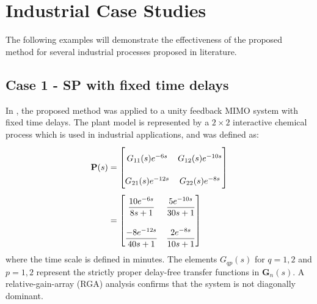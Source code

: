 \documentclass[A4, 10pt, conference]{ieeeconf}
\begin{document}

\section{Industrial Case Studies}
\label{sec:4}
The following examples will demonstrate the effectiveness of the proposed method for several industrial processes proposed in literature.
\subsection{Case 1 - SP with fixed time delays} \label{ex:1}
In \cite{GKL10b}, the proposed method was applied to a unity feedback MIMO system with fixed time delays. The plant model is represented by a $2 \times 2$ interactive chemical process which is used in industrial applications, and was defined as:
\begin{align} \label{eq:plant}
\renewcommand{\arraystretch}{2.2}
\mathbf{P}(s)&=
\begin{bmatrix}
         G_{11}(s)e^{-6s} & G_{12}(s)e^{-10s}\\
         G_{21}(s)e^{-12s} & G_{22}(s)e^{-8s}
\end{bmatrix} \nonumber \\
&=
\begin{bmatrix}
         \dfrac{10e^{-6s}}{8s+1} & \dfrac{5e^{-10s}}{30s+1}\\[1em]
         \dfrac{-8e^{-12s}}{40s+1} & \dfrac{2e^{-8s}}{10s+1}
\end{bmatrix}
\end{align}
where the time scale is defined in minutes. The elements $G_{qp}(s)$ for $q=1,2$ and $p=1,2$ represent the strictly proper delay-free transfer functions in $\mathbf{G}_n(s)$. A relative-gain-array (RGA) analysis confirms that the system is not diagonally dominant. 
\end{document}
